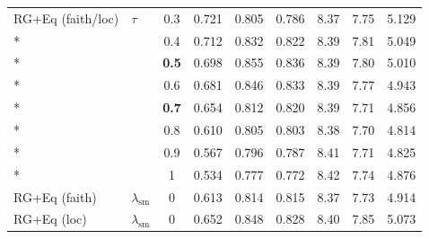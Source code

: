 \begin{longtable}{@{}l l c c c c c c c@{}}
\midrule
RG+Eq (faith/loc) & $\tau$ & 0.3 & 0.721 & 0.805 & 0.786 & 8.37 & 7.75 & 5.129 \\*
 &  & 0.4 & 0.712 & 0.832 & 0.822 & 8.39 & 7.81 & 5.049 \\*
 &  & \textbf{0.5} & 0.698 & 0.855 & 0.836 & 8.39 & 7.80 & 5.010 \\*
 &  & 0.6 & 0.681 & 0.846 & 0.833 & 8.39 & 7.77 & 4.943 \\*
 &  & \textbf{0.7} & 0.654 & 0.812 & 0.820 & 8.39 & 7.71 & 4.856 \\*
 &  & 0.8 & 0.610 & 0.805 & 0.803 & 8.38 & 7.70 & 4.814 \\*
 &  & 0.9 & 0.567 & 0.796 & 0.787 & 8.41 & 7.71 & 4.825 \\*
 &  & 1 & 0.534 & 0.777 & 0.772 & 8.42 & 7.74 & 4.876 \\
\midrule
RG+Eq (faith) & $\lambda_{\mathrm{sm}}$ & 0 & 0.613 & 0.814 & 0.815 & 8.37 & 7.73 & 4.914 \\
\midrule
RG+Eq (loc) & $\lambda_{\mathrm{sm}}$ & 0 & 0.652 & 0.848 & 0.828 & 8.40 & 7.85 & 5.073 \\
\end{longtable}
